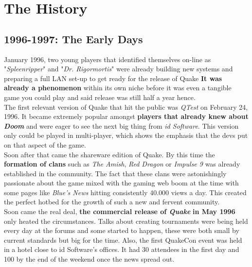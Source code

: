 \section{The History}
\label{sec::history}

\subsection{1996-1997: The Early Days}

January 1996, two young players that identified themselves on-line as "\textit{Spleenripper}" and "\textit{Dr. Rigormortis}" were already building new systems and preparing a full LAN set-up to get ready for the release of Quake \citep{clanHistory} \textbf{It was already a phenomenon} within its own niche before it was even a tangible game you could play and said release was still half a year hence.\\


The first relevant version of Quake that hit the public was \textit{QTest} \citep{qtest} on February 24, 1996. It became extremely popular amongst \textbf{players that already knew about \textit{Doom}} \citep{game:doom} and were eager to see the next big thing from \textit{id Software}. This version only could be played in multi-player, which shows the emphasis that the devs put on that aspect of the game.\\

Soon after that came the shareware edition of Quake. By this time the \textbf{formation of clans} such as \textit{The Amish}, \textit{Red Dragon} or \textit{Impulse 9} was already established in the community. The fact that these clans were astonishingly passionate about the game mixed with the gaming web boom at the time with some pages like \textit{Blue's News} hitting consistently 40.000 views a day. This created the perfect hotbed for the growth of such a new and fervent community.\\

Soon came the real deal, \textbf{the commercial release of \textit{Quake}} \citep{game:quake1} \textbf{in May 1996} only heated the circumstances. Talks about creating tournaments were being held every day at the forums and some started to happen, these were both small by current standards but big for the time. Also, the first QuakeCon \citep{quakecon} \parencite[p.~11]{van2013video} event was held in a hotel close to id Software's offices. It had 30 attendees in the first day and 100 by the end of the weekend once the news spread out.\\

